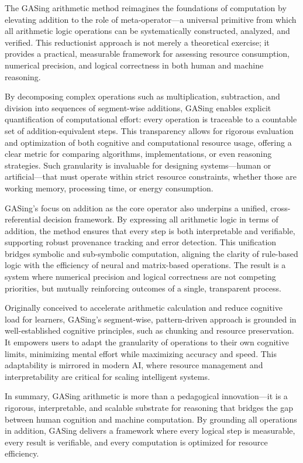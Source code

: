The GASing arithmetic method reimagines the foundations of computation by elevating addition to the role of meta-operator—a universal primitive from which all arithmetic logic operations can be systematically constructed, analyzed, and verified. This reductionist approach is not merely a theoretical exercise; it provides a practical, measurable framework for assessing resource consumption, numerical precision, and logical correctness in both human and machine reasoning.

By decomposing complex operations such as multiplication, subtraction, and division into sequences of segment-wise additions, GASing enables explicit quantification of computational effort: every operation is traceable to a countable set of addition-equivalent steps. This transparency allows for rigorous evaluation and optimization of both cognitive and computational resource usage, offering a clear metric for comparing algorithms, implementations, or even reasoning strategies. Such granularity is invaluable for designing systems—human or artificial—that must operate within strict resource constraints, whether those are working memory, processing time, or energy consumption.

GASing’s focus on addition as the core operator also underpins a unified, cross-referential decision framework. By expressing all arithmetic logic in terms of addition, the method ensures that every step is both interpretable and verifiable, supporting robust provenance tracking and error detection. This unification bridges symbolic and sub-symbolic computation, aligning the clarity of rule-based logic with the efficiency of neural and matrix-based operations. The result is a system where numerical precision and logical correctness are not competing priorities, but mutually reinforcing outcomes of a single, transparent process.

Originally conceived to accelerate arithmetic calculation and reduce cognitive load for learners, GASing’s segment-wise, pattern-driven approach is grounded in well-established cognitive principles, such as chunking and resource preservation. It empowers users to adapt the granularity of operations to their own cognitive limits, minimizing mental effort while maximizing accuracy and speed. This adaptability is mirrored in modern AI, where resource management and interpretability are critical for scaling intelligent systems.

In summary, GASing arithmetic is more than a pedagogical innovation—it is a rigorous, interpretable, and scalable substrate for reasoning that bridges the gap between human cognition and machine computation. By grounding all operations in addition, GASing delivers a framework where every logical step is measurable, every result is verifiable, and every computation is optimized for resource efficiency.

